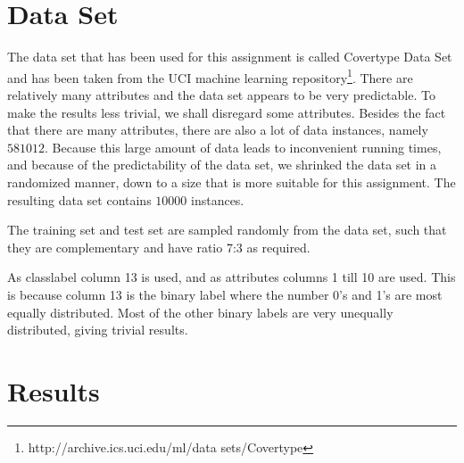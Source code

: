 \documentclass[12pt]{article}
\theoremstyle{definition}
\begin{document}
\maketitle

\section{Data Set}
\label{sec:dataset}

The data set that has been used for this assignment is called Covertype Data Set and has been
taken from the UCI machine learning
repository\footnote{http://archive.ics.uci.edu/ml/data sets/Covertype}.
There are relatively many attributes and the data set appears to be very predictable.
To make the results less trivial, we shall disregard some attributes.
Besides the fact that there are many attributes, there are also a lot of data instances,
namely $581012$.
Because this large amount of data leads to inconvenient running times, and because of the
predictability of the data set, we shrinked the data set in a randomized manner,
down to a size that is more suitable for this assignment.
The resulting data set contains $10000$ instances.

The training set and test set are sampled randomly from the data set, such that
they are complementary and have ratio 7:3 as required.

As classlabel column 13 is used, and as attributes columns 1 till 10 are used.
This is because column 13 is the binary label where the number 0's and 1's are
most equally distributed.
Most of the other binary labels are very unequally distributed, giving trivial results.

\section{Results}
\label{sec:results}
\end{document}

